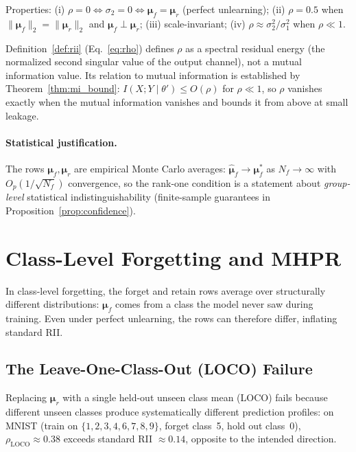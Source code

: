 \documentclass[smallextended]{svjour3}       %
\begin{document}
Properties: (i) $\rho = 0 \iff \sigma_2 = 0 \iff \boldsymbol{\mu}_f = \boldsymbol{\mu}_r$ (perfect unlearning); (ii) $\rho = 0.5$ when $\|\boldsymbol{\mu}_f\|_2=\|\boldsymbol{\mu}_r\|_2$ and $\boldsymbol{\mu}_f \perp \boldsymbol{\mu}_r$; (iii) scale-invariant; (iv) $\rho \approx \sigma_2^2/\sigma_1^2$ when $\rho \ll 1$.

Definition~\ref{def:rii} (Eq.~\eqref{eq:rho}) defines $\rho$ as a spectral residual energy (the normalized second singular value of the output channel), not a mutual information value. Its relation to mutual information is established by Theorem~\ref{thm:mi_bound}: $I(X;Y\mid\theta')\le O(\rho)$ for $\rho\ll1$, so $\rho$ vanishes exactly when the mutual information vanishes and bounds it from above at small leakage.

\paragraph{Statistical justification.}
The rows $\boldsymbol{\mu}_f, \boldsymbol{\mu}_r$ are empirical Monte Carlo averages: $\hat{\boldsymbol{\mu}}_f\to\boldsymbol{\mu}_f^*$ as $N_f\to\infty$ with $O_p(1/\sqrt{N_f})$ convergence, so the rank-one condition is a statement about \emph{group-level} statistical indistinguishability (finite-sample guarantees in Proposition~\ref{prop:confidence}).

\section{Class-Level Forgetting and MHPR}
\label{sec:class_baselines}

In class-level forgetting, the forget and retain rows average over structurally different distributions: $\boldsymbol{\mu}_f$ comes from a class the model never saw during training. Even under perfect unlearning, the rows can therefore differ, inflating standard RII.

\subsection{The Leave-One-Class-Out (LOCO) Failure}

Replacing $\boldsymbol{\mu}_r$ with a single held-out unseen class mean (LOCO) fails because different unseen classes produce systematically different prediction profiles: on MNIST (train on $\{1,2,3,4,6,7,8,9\}$, forget class~5, hold out class~0), $\rho_{\mathrm{LOCO}}{\approx}0.38$ exceeds standard RII ${\approx}0.14$, opposite to the intended direction.
\end{document}
